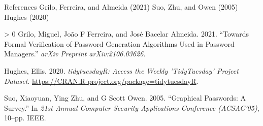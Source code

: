 \documentclass[10pt,ignorenonframetext,aspectratio=169]{beamer}
\newlength{\cslhangindent}
\newenvironment{CSLReferences}[3] %
 {%
  \setlength{\parindent}{0pt}
  \ifodd #1 \everypar{\setlength{\hangindent}{\cslhangindent}}\ignorespaces\fi
  \ifnum #2 > 0
  \setlength{\parskip}{#2\baselineskip}
  \fi
 }%
 {}
\begin{document}
\begin{frame}{References}
\protect\hypertarget{references}{}
Grilo, Ferreira, and Almeida (2021) Suo, Zhu, and Owen (2005) Hughes
(2020)

\hypertarget{refs}{}
\begin{CSLReferences}{1}{0}
\leavevmode\hypertarget{ref-grilo2021towards}{}%
Grilo, Miguel, João F Ferreira, and José Bacelar Almeida. 2021.
{``Towards Formal Verification of Password Generation Algorithms Used in
Password Managers.''} \emph{arXiv Preprint arXiv:2106.03626}.

\leavevmode\hypertarget{ref-tidyTuesday}{}%
Hughes, Ellis. 2020. \emph{tidytuesdayR: Access the Weekly 'TidyTuesday'
Project Dataset}. \url{https://CRAN.R-project.org/package=tidytuesdayR}.

\leavevmode\hypertarget{ref-suo2005graphical}{}%
Suo, Xiaoyuan, Ying Zhu, and G Scott Owen. 2005. {``Graphical Passwords:
A Survey.''} In \emph{21st Annual Computer Security Applications
Conference (ACSAC'05)}, 10--pp. IEEE.

\end{CSLReferences}
\end{frame}
\end{document}
